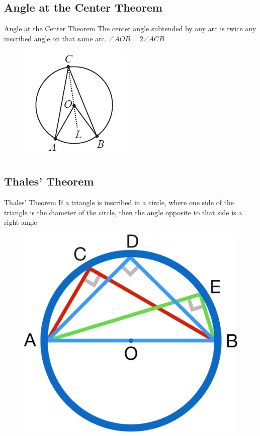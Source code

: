 \documentclass{beamer}
\begin{document}
\subsection{Angle at the Center Theorem}
\begin{frame}{Angle at the Center Theorem}
The center angle subtended by any arc is twice any inscribed angle on that same arc. $\angle AOB = 2\angle ACB$


\begin{figure}[h!]
	\centering
	\includegraphics[height=0.4\textheight]{Graphics/Week_13/StarTreck.png}
\end{figure}
\end{frame}

\subsection{Thales' Theorem}
\begin{frame}{Thales' Theorem}
If a triangle is inscribed in a circle, where one side of the triangle is the diameter of the circle, then the angle opposite to that side is a right angle

\begin{figure}[h!]
	\centering
	\includegraphics[height=0.4\textheight]{Graphics/Week_13/ThalesTheorem.png}
\end{figure}
\end{frame}
\end{document}
